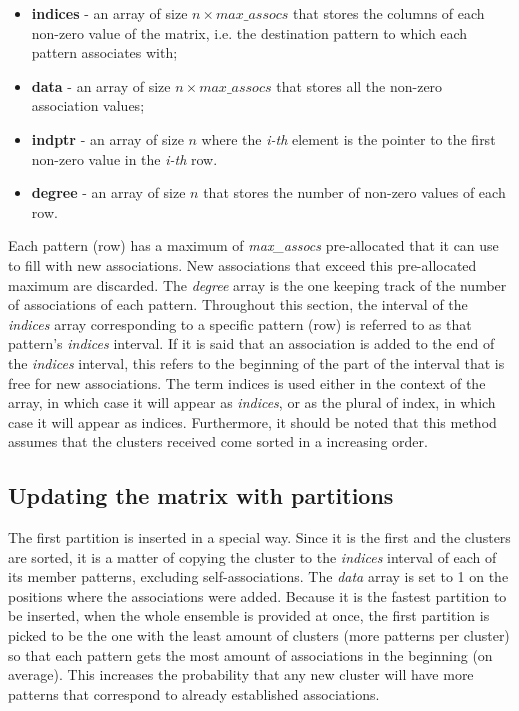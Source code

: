 \begin{itemize}
	\item \textbf{indices} - an array of size $n \times max\_assocs$ that stores the columns of each non-zero value of the matrix, i.e. the destination pattern to which each pattern associates with;
	\item \textbf{data} - an array of size $n \times max\_assocs$ that stores all the non-zero association values;
	\item \textbf{indptr} - an array of size $n$  where the \emph{i-th} element is the pointer to the first non-zero value in the \emph{i-th} row.
	\item \textbf{degree} - an array of size $n$  that stores the number of non-zero values of each row.
\end{itemize}

Each pattern (row) has a maximum of \emph{max\_assocs} pre-allocated that it can use to fill with new associations.
New associations that exceed this pre-allocated maximum are discarded.
The \emph{degree} array is the one keeping track of the number of associations of each pattern.
Throughout this section, the interval of the \emph{indices} array corresponding to a specific pattern (row) is referred to as that pattern's \emph{indices} interval.
If it is said that an association is added to the end of the \emph{indices} interval, this refers to the beginning of the part of the interval that is free for new associations.
The term indices is used either in the context of the array, in which case it will appear as \emph{indices}, or as the plural of index, in which case it will appear as indices.
Furthermore, it should be noted that this method assumes that the clusters received come sorted in a increasing order.

\subsection{Updating the matrix with partitions}

The first partition is inserted in a special way.
Since it is the first and the clusters are sorted, it is a matter of copying the cluster to the \emph{indices} interval of each of its member patterns, excluding self-associations.
The \emph{data} array is set to 1 on the positions where the associations were added.
Because it is the fastest partition to be inserted, when the whole ensemble is provided at once, the first partition is picked to be the one with the least amount of clusters (more patterns per cluster) so that each pattern gets the most amount of associations in the beginning (on average).
This increases the probability that any new cluster will have more patterns that correspond to already established associations.

